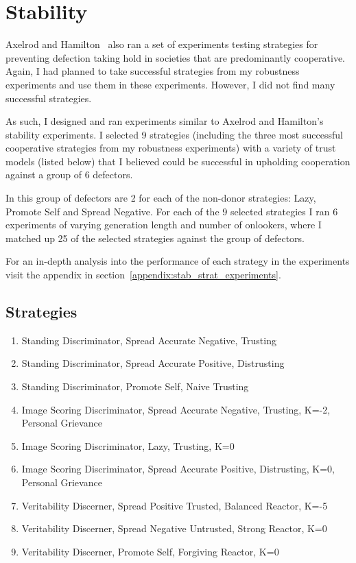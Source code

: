 \documentclass[]{final_report}
\begin{document}
\section{Stability}
Axelrod and Hamilton~\cite{evolution_of_cooperation} also ran a set of experiments testing strategies for preventing defection taking hold in societies that are predominantly cooperative. Again, I had planned to take successful strategies from my robustness experiments and use them in these experiments. However, I did not find many successful strategies.\par 
As such, I designed and ran experiments similar to Axelrod and Hamilton's stability experiments. I selected 9 strategies (including the three most successful cooperative strategies from my robustness experiments) with a variety of trust models (listed below) that I believed could be successful in upholding cooperation against a group of 6 defectors.\par 
In this group of defectors are 2 for each of the non-donor strategies: Lazy, Promote Self and Spread Negative. For each of the 9 selected strategies I ran 6 experiments of varying generation length and number of onlookers, where I matched up 25 of the selected strategies against the group of defectors.\par 
For an in-depth analysis into the performance of each strategy in the experiments visit the appendix in section~\ref{appendix:stab_strat_experiments}.

\subsection{Strategies}
\begin{enumerate}
	\item Standing Discriminator, Spread Accurate Negative, Trusting
	\item Standing Discriminator, Spread Accurate Positive, Distrusting
	\item Standing Discriminator, Promote Self, Naive Trusting
	\item Image Scoring Discriminator, Spread Accurate Negative, Trusting, K=-2, Personal Grievance
	\item Image Scoring Discriminator, Lazy, Trusting, K=0
	\item Image Scoring Discriminator, Spread Accurate Positive, Distrusting, K=0, Personal Grievance
	\item Veritability Discerner, Spread Positive Trusted, Balanced Reactor, K=-5
	\item Veritability Discerner, Spread Negative Untrusted, Strong Reactor, K=0
	\item Veritability Discerner, Promote Self, Forgiving Reactor, K=0
\end{enumerate}
\end{document}
